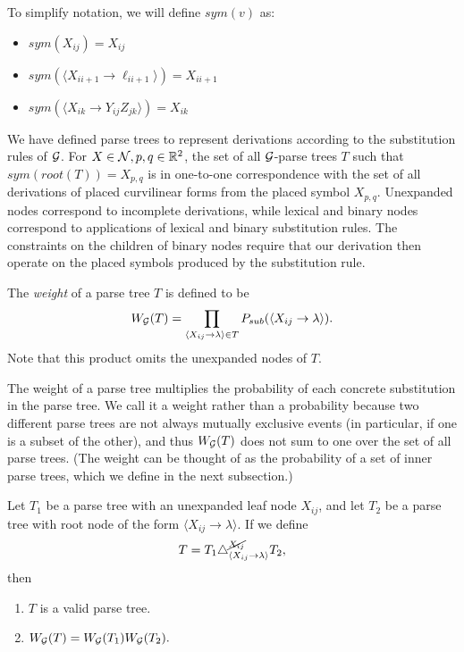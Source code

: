 To simplify notation, we will define $sym(v)$ as:
\begin{itemize}
\item $sym(X_{ij}) = X_{ij}$
\item $sym(\langle X_{i i+1} \to \ell_{i i+1}\rangle) = X_{i i+1}$
\item $sym(\langle X_{ik} \to Y_{ij} Z_{jk}\rangle) = X_{i k}$
\end{itemize}

We have defined parse trees to represent derivations according to the
substitution rules of ${\mathcal G}$.  For $X\in {\mathcal N}, p,q\in \mathbb{R}^2$, the set
of all ${\mathcal G}$-parse trees $T$ such that $sym(root(T)) = X_{p,q}$ is in
one-to-one correspondence with the set of all derivations of placed
curvilinear forms from the placed symbol $X_{p,q}$. Unexpanded nodes
correspond to incomplete derivations, while lexical and binary nodes
correspond to applications of lexical and binary substitution
rules. The constraints on the children of binary nodes require that
our derivation then operate on the placed symbols produced by the
substitution rule.

\begin{defn}
The \emph{weight} of a parse tree $T$ is defined to be
$$ W_{{\mathcal G}}(T) = \prod_{\langle X_{ij} \to \lambda \rangle\in T} P_{sub}(
\langle X_{ij} \to \lambda \rangle).$$ Note that this product omits
the unexpanded nodes of $T$.
\end{defn}

The weight of a parse tree multiplies the probability of each concrete
substitution in the parse tree.  We call it a weight rather than a
probability because two different parse trees are not always mutually
exclusive events (in particular, if one is a subset of the other), and
thus $W_{{\mathcal G}}(T)$ does not sum to one over the set of all parse
trees. (The weight can be thought of as the probability of a set of
inner parse trees, which we define in the next subsection.)

\begin{obs}
Let $T_1$ be a parse tree with an unexpanded leaf node $X_{ij}$, and let
$T_2$ be a parse tree with root node of the form $\langle X_{ij} \to
\lambda \rangle$. If we define
$$T = T_1 \triangle^{\cancel{X_{ij}}}_{\langle X_{ij} \to \lambda
  \rangle} T_2,$$
then
\begin{enumerate}
\item $T$ is a valid parse tree.
\item $W_{{\mathcal G}}(T) = W_{{\mathcal G}}(T_1) W_{{\mathcal G}}(T_2).$
\end{enumerate}
\end{obs}

